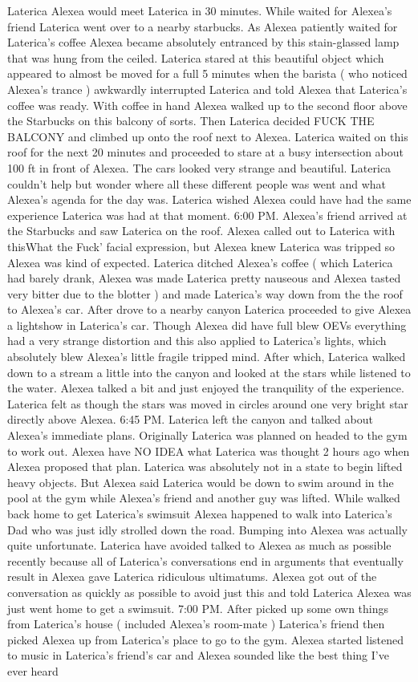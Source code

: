 \documentclass[12pt]{book}
\begin{document}
Laterica Alexea would meet Laterica in 30 minutes. While waited for Alexea's friend Laterica went over to a nearby starbucks. As Alexea patiently waited for Laterica's coffee Alexea became absolutely entranced by this stain-glassed lamp that was hung from the ceiled. Laterica stared at this beautiful object which appeared to almost be moved for a full 5 minutes when the barista ( who noticed Alexea's trance ) awkwardly interrupted Laterica and told Alexea that Laterica's coffee was ready. With coffee in hand Alexea walked up to the second floor above the Starbucks on this balcony of sorts. Then Laterica decided FUCK THE BALCONY and climbed up onto the roof next to Alexea. Laterica waited on this roof for the next 20 minutes and proceeded to stare at a busy intersection about 100 ft in front of Alexea. The cars looked very strange and beautiful. Laterica couldn't help but wonder where all these different people was went and what Alexea's agenda for the day was. Laterica wished Alexea could have had the same experience Laterica was had at that moment. 6:00 PM. Alexea's friend arrived at the Starbucks and saw Laterica on the roof. Alexea called out to Laterica with thisWhat the Fuck' facial expression, but Alexea knew Laterica was tripped so Alexea was kind of expected. Laterica ditched Alexea's coffee ( which Laterica had barely drank, Alexea was made Laterica pretty nauseous and Alexea tasted very bitter due to the blotter ) and made Laterica's way down from the the roof to Alexea's car. After drove to a nearby canyon Laterica proceeded to give Alexea a lightshow in Laterica's car. Though Alexea did have full blew OEVs everything had a very strange distortion and this also applied to Laterica's lights, which absolutely blew Alexea's little fragile tripped mind. After which, Laterica walked down to a stream a little into the canyon and looked at the stars while listened to the water. Alexea talked a bit and just enjoyed the tranquility of the experience. Laterica felt as though the stars was moved in circles around one very bright star directly above Alexea. 6:45 PM. Laterica left the canyon and talked about Alexea's immediate plans. Originally Laterica was planned on headed to the gym to work out. Alexea have NO IDEA what Laterica was thought 2 hours ago when Alexea proposed that plan. Laterica was absolutely not in a state to begin lifted heavy objects. But Alexea said Laterica would be down to swim around in the pool at the gym while Alexea's friend and another guy was lifted. While walked back home to get Laterica's swimsuit Alexea happened to walk into Laterica's Dad who was just idly strolled down the road. Bumping into Alexea was actually quite unfortunate. Laterica have avoided talked to Alexea as much as possible recently because all of Laterica's conversations end in arguments that eventually result in Alexea gave Laterica ridiculous ultimatums. Alexea got out of the conversation as quickly as possible to avoid just this and told Laterica Alexea was just went home to get a swimsuit. 7:00 PM. After picked up some own things from Laterica's house ( included Alexea's room-mate ) Laterica's friend then picked Alexea up from Laterica's place to go to the gym. Alexea started listened to music in Laterica's friend's car and Alexea sounded like the best thing I've ever heard 
\end{document}
